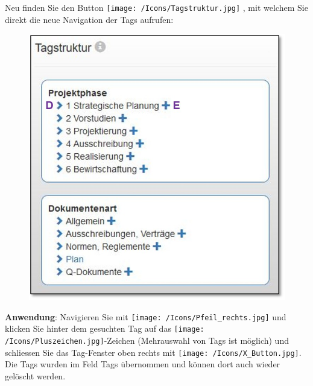 Neu finden Sie  den Button \texttt{[image: /Icons/Tagstruktur.jpg]} , mit welchem Sie direkt die neue Navigation der Tags aufrufen:


\begin{figure}   %
  \vspace{-23pt}      %
  \begin{center}
    \includegraphics[width=1\linewidth]{../chapters/02_Pilatus/pictures/04_Dok_Struktur_eingeklappt.jpg}
  \end{center}
  \vspace{-20pt}
  \vspace{-10pt}
\end{figure}

\textbf{Anwendung}: Navigieren Sie mit \texttt{[image: /Icons/Pfeil\_rechts.jpg]}  und klicken Sie hinter dem gesuchten Tag auf das \texttt{[image: /Icons/Pluszeichen.jpg]}-Zeichen  (Mehrauswahl von Tags ist möglich) und schliessen Sie das Tag-Fenster oben rechts mit \texttt{[image: /Icons/X\_Button.jpg]}. Die Tags wurden im Feld Tags übernommen und können dort auch wieder gelöscht werden.

